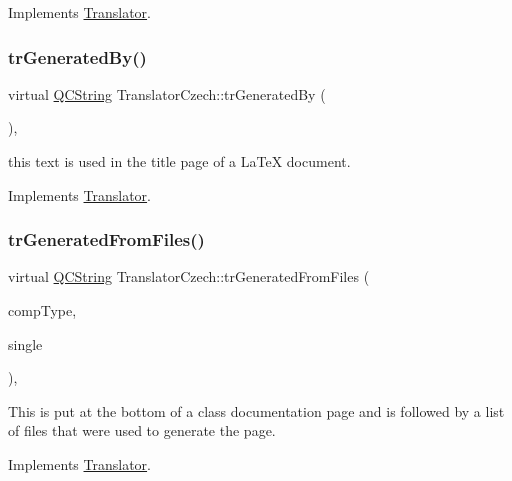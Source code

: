 Implements \mbox{\hyperlink{class_translator}{Translator}}.

\mbox{\label{class_translator_czech_a911e4ad824acd4622a92776b6a81230c}} 
\subsubsection{\texorpdfstring{trGeneratedBy()}{trGeneratedBy()}}
{\footnotesize\ttfamily virtual \mbox{\hyperlink{class_q_c_string}{Q\+C\+String}} Translator\+Czech\+::tr\+Generated\+By (\begin{DoxyParamCaption}{ }\end{DoxyParamCaption})\hspace{0.3cm}{\ttfamily [inline]}, {\ttfamily [virtual]}}

this text is used in the title page of a La\+TeX document. 

Implements \mbox{\hyperlink{class_translator}{Translator}}.

\mbox{\label{class_translator_czech_a436f948112829e211ffc6df0887ef06e}} 
\subsubsection{\texorpdfstring{trGeneratedFromFiles()}{trGeneratedFromFiles()}}
{\footnotesize\ttfamily virtual \mbox{\hyperlink{class_q_c_string}{Q\+C\+String}} Translator\+Czech\+::tr\+Generated\+From\+Files (\begin{DoxyParamCaption}\item[{\mbox{\hyperlink{class_class_def_ae70cf86d35fe954a94c566fbcfc87939}{Class\+Def\+::\+Compound\+Type}}}]{comp\+Type,  }\item[{bool}]{single }\end{DoxyParamCaption})\hspace{0.3cm}{\ttfamily [inline]}, {\ttfamily [virtual]}}

This is put at the bottom of a class documentation page and is followed by a list of files that were used to generate the page. 

Implements \mbox{\hyperlink{class_translator}{Translator}}.

